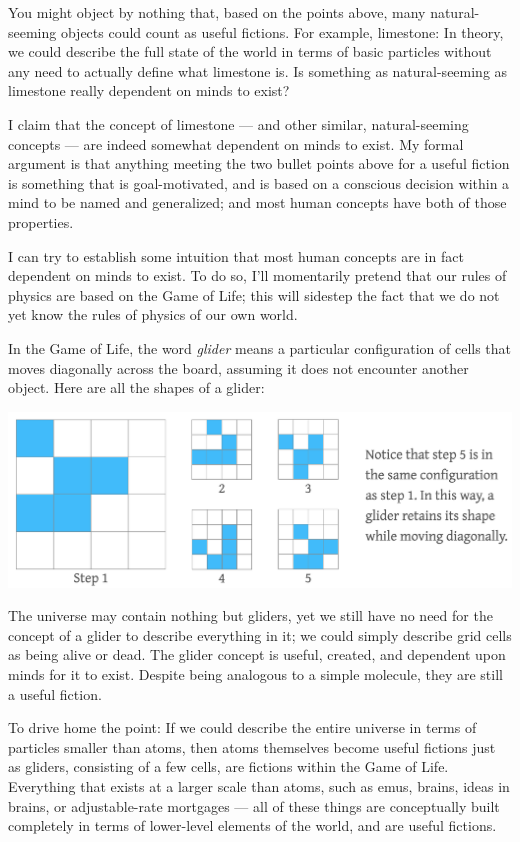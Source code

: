 \documentclass[9pt, twoside]{book}
\theoremstyle{argtstyle}
\begin{document}
You might object by nothing that, based on the points above,
many natural-seeming objects could count as useful fictions.
For example, limestone: In theory, we could describe the full state of the world
in terms of basic particles without any need to actually
define what limestone is. Is something as natural-seeming as limestone really
dependent on minds to exist?

I claim that the concept of limestone --- and other similar, natural-seeming
concepts --- are indeed somewhat dependent on minds to exist.
My formal argument is that anything meeting the two bullet points above for a
useful fiction is something that is goal-motivated, and is based on a conscious
decision within a mind to be named and generalized; and most human concepts have
both of those properties.

I can try to establish some intuition that most human concepts are in fact
dependent on minds to exist. To do so, I'll momentarily pretend that our rules
of physics are based on the Game of Life; this will sidestep the fact that we do
not yet know the rules of physics of our own world.

In the Game of Life, the word {\em glider} means a particular 
configuration of cells that moves diagonally across the board, assuming it does
not encounter another object.
% 
% 
Here are all the shapes of a glider:
\begin{center}
\includegraphics[width=\textwidth]{glider3.png}
\end{center}
The universe may contain nothing but gliders, yet we still have no need
for the concept of a glider to describe everything in it; we could simply
describe grid cells as being alive or dead.
The glider concept is useful, created, and dependent upon minds for it to
exist. Despite being analogous to a simple molecule, they are still a useful
fiction.

To drive home the point: If we could describe the entire universe in terms
of particles smaller than atoms, then atoms themselves become useful fictions
just as gliders, consisting of a few cells, are fictions within the Game of Life.
Everything that exists at a larger scale than atoms, such as emus, brains, ideas in
brains, or adjustable-rate mortgages --- all of these things are conceptually
built completely in terms of lower-level elements of the world, and are useful
fictions.
\end{document}
